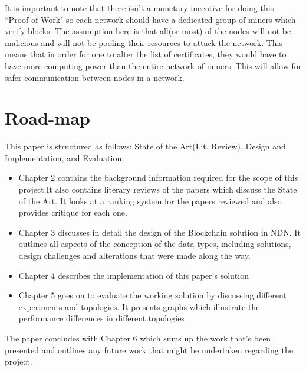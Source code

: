  It is important to note that there isn't a monetary incentive for doing this ``Proof-of-Work"\cite{07} so each network should have a dedicated group of miners which verify blocks. The assumption here is that all(or most) of the nodes will not be malicious and will not be pooling their resources to attack the network. This means that in order for one to alter the list of certificates, they would have to have more computing power than the entire network of miners. This will allow for safer communication between nodes in a network. 

\section{Road-map}

This paper is structured as follows: State of the Art(Lit. Review), Design and Implementation, and Evaluation.
\begin{itemize}
\item Chapter 2 contains the background information required for the scope of this project.It also contains literary reviews of the papers which discuss the State of the Art. It looks at a ranking system for the papers reviewed and also provides critique for each one. 

\item Chapter 3 discusses in detail the design of the Blockchain solution in NDN. It outlines all aspects of the conception of the data types, including solutions, design challenges and alterations that were made along the way.

\item Chapter 4 describes the implementation of this paper's solution

\item Chapter 5 goes on to evaluate the working solution by discussing different experiments and topologies. It presents graphs which illustrate the performance differences in different topologies

\end{itemize}
The paper concludes with Chapter 6 which sums up the work that's been presented and outlines any future work that might be undertaken regarding the project.